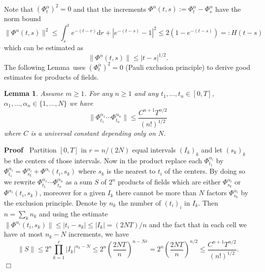 \documentclass[11pt]{article}
\newcommand{\assign}{:=}
\newcommand{\backassign}{=:}
\newcommand{\mathd}{\mathrm{d}}
\newenvironment{proof}{\noindent\textbf{Proof\ }}{\hspace*{\fill}$\Box$\medskip}
\newtheorem{lemma}{Lemma}
\begin{document}
\

Note that $(\Phi^{\alpha}_t)^2 = 0$ and that the increments $\Phi^{\alpha}
(t, s) \assign \Phi^{\alpha}_t - \Phi^{\alpha}_s$ have the norm bound
\[ \| \Phi^{\alpha} (t, s) \|^2 \leqslant \int_s^t e^{- (t - r)} \mathd r + |
   e^{- (t - s)} - 1 |^2 \leqslant 2 (1 - e^{- (t - s)}) \backassign H (t - s)
\]
which can be estimated as
\[ \| \Phi^{\alpha} (t, s) \| \leqslant | t - s |^{1 / 2} . \]
The following Lemma~uses $(\Phi^{\alpha}_t)^2 = 0$ (Pauli exclusion principle)
to derive good estimates for products of fields.

\begin{lemma}
  Assume $m \geqslant 1$. For any $n \geqslant 1$ and any $t_1, \ldots, t_n
  \in [0, T]$, $\alpha_1, \ldots, \alpha_n \in \{ 1, \ldots, N \}$ we have
  \[ \| \Phi^{\alpha_1}_{t_1} \cdots \Phi^{\alpha_n}_{t_n} \| \leqslant
     \frac{C^{n + 1} T^{n / 2}}{(n!)^{1 / 2}} \]
  where $C$ is a universal constant depending only on $N$.
\end{lemma}

\begin{proof}
  Partition $[0, T]$ in $r = n / (2 N)$ equal intervals $(I_k)_k$ and let
  $(s_k)_k$ be the centers of those intervals. Now in the product replace each
  $\Phi^{\alpha_i}_{t_1}$ by $\Phi^{\alpha_i}_{t_1} = \Phi^{\alpha_i}_{s_k} +
  \Phi^{\alpha_i} (t_i, s_k)$ where $s_k$ is the nearest to $t_i$ of the
  centers. By doing so we rewrite $\Phi^{\alpha_1}_{t_1} \cdots
  \Phi^{\alpha_n}_{t_n}$ as a sum $S$ of $2^n$ products of fields which are
  either $\Phi^{\alpha_i}_{s_k}$ or \ $\Phi^{\alpha_i} (t_i, s_k)$, moreover
  for a given $I_k$ there cannot be more than $N$ factors
  $\Phi^{\alpha_i}_{s_k}$ by the exclusion principle. Denote by $n_k$ the
  number of $(t_i)_i$ in $I_k$. Then $n = \sum_k n_k$ and using the estimate
  $\| \Phi^{\alpha_i} (t_i, s_k) \| \leqslant | t_i - s_k | \leqslant | I_k |
  = (2 N T) / n$ and the fact that in each cell we have at most $n_k - N$
  increments, we have
  \[ \| S \| \leqslant 2^n \prod_{k = 1}^r | I_k |^{n_k - N} \leqslant 2^n
     \left( \frac{2 N T}{n} \right)^{n - N r} = 2^n \left( \frac{2 N T}{n}
     \right)^{n / 2} \leqslant \frac{C^{n + 1} T^{n / 2}}{(n!)^{1 / 2}} . \]
\end{proof}
\end{document}
